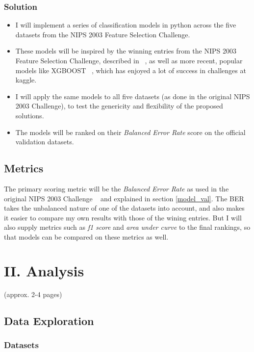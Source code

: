 \documentclass[12pt]{article}
\begin{document}
\subsubsection{Solution}
\begin{itemize}
\item I will implement a series of classification models in python across the five datasets from the NIPS 2003 Feature Selection Challenge. 
\item These models will be inspired by the winning entries from the NIPS 2003 Feature Selection Challenge, described in ~\cite{nips03book}, as well as more recent, popular models like XGBOOST ~\cite{xgboostcite}, which has enjoyed a lot of success in challenges at kaggle.
\item I will apply the same models to all five datasets (as done in the original NIPS 2003 Challenge), to test the genericity and flexibility of the proposed solutions.
\item The models will be ranked on their \emph{Balanced Error Rate} score on the official validation datasets.
\end{itemize}

\subsection{Metrics}

The primary scoring metric will be the \emph{Balanced Error Rate} as used in the original NIPS 2003 Challenge ~\cite{nips03evaluation} and explained in section \ref{model_val}. The BER takes the unbalanced nature of one of the datasets into account, and also makes it easier to compare my own results with those of the wining entries. But I will also supply metrics such as \emph{f1 score} and \emph{area under curve} to the final rankings, so that models can be compared on these metrics as well.



\section{II. Analysis}
(approx. 2-4 pages)

\subsection{Data Exploration}

\subsubsection{Datasets}
\end{document}

